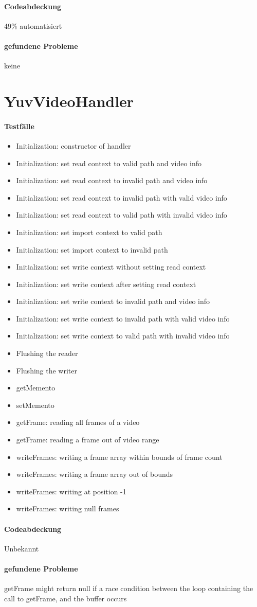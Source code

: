 \paragraph*{Codeabdeckung}
49\% automatisiert

\paragraph*{gefundene Probleme}
keine

\section{YuvVideoHandler}
\paragraph*{Testfälle}
\begin{itemize}
\item Initialization: constructor of handler
\item Initialization: set read context to valid path and video info
\item Initialization: set read context to invalid path and video info
\item Initialization: set read context to invalid path with valid video info
\item Initialization: set read context to valid path with invalid video info
\item Initialization: set import context to valid path
\item Initialization: set import context to invalid path
\item Initialization: set write context without setting read context
\item Initialization: set write context after setting read context
\item Initialization: set write context to invalid path and video info
\item Initialization: set write context to invalid path with valid video info
\item Initialization: set write context to valid path with invalid video info
\item Flushing the reader
\item Flushing the writer
\item getMemento
\item setMemento
\item getFrame: reading all frames of a video
\item getFrame: reading a frame out of video range
\item writeFrames: writing a frame array within bounds of frame count
\item writeFrames: writing a frame array out of bounds
\item writeFrames: writing at position -1
\item writeFrames: writing null frames
\end{itemize}

\paragraph*{Codeabdeckung}
Unbekannt

\paragraph*{gefundene Probleme}
getFrame might return null if a race condition between the loop containing the call to getFrame, and the buffer occurs